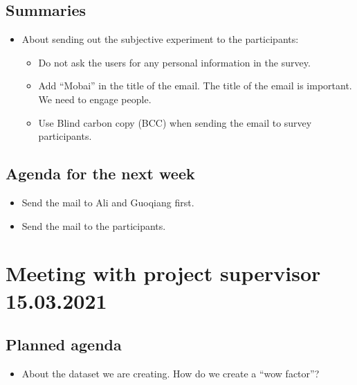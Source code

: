 \subsection*{Summaries}
\begin{itemize}
    \item About sending out the subjective experiment to the participants:
    \begin{itemize}
        \item Do not ask the users for any personal information in the survey.
        \item Add “Mobai” in the title of the email. The title of the email is important. We need to engage people.
        \item Use Blind carbon copy (BCC) when sending the email to survey participants.
    \end{itemize}
\end{itemize}

\subsection*{Agenda for the next week}
\begin{itemize}
    \item Send the mail to Ali and Guoqiang first.
    \item Send the mail to the participants.
\end{itemize}



\section*{Meeting with project supervisor 15.03.2021}
\subsection*{Planned agenda}
\begin{itemize}
    \item About the dataset we are creating. How do we create a “wow factor”?
\end{itemize}


